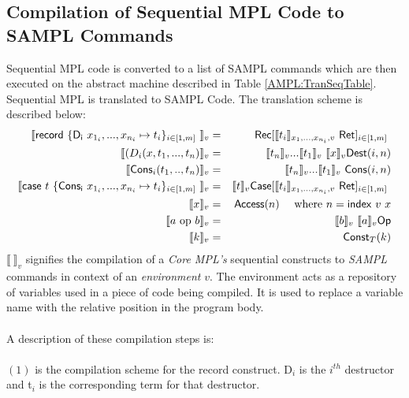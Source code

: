 \documentclass[11pt]{article}
\newcommand{\<}{\langle}
\renewcommand{\>}{\rangle}
\begin{document}
\subsection {Compilation of Sequential MPL Code to SAMPL Commands}
Sequential MPL code is converted to a list of SAMPL commands which are then executed on the abstract machine described in Table \ref {AMPL:TranSeqTable}. Sequential MPL is translated to SAMPL Code. The translation scheme is described below: 
 \begin{eqnarray} 
  \llbracket {\sf record}~\{ {\sf D_i} ~x_{1_i},...,x_{n_i} \mapsto t_i \}_{i \in [1,m]~} \rrbracket_v & = & {\sf Rec}[\llbracket t_i \rrbracket_{x_1,...,x_{n_i},v} ~{\sf Ret}]_{i \in [1,m]~} \\
  \llbracket (D_i(x,t_1,...,t_n) \rrbracket_v & = & \llbracket t_n \rrbracket_v ... \llbracket t_1 \rrbracket_v ~\llbracket x \rrbracket_v {\sf Dest}(i,n) \\
  \llbracket {\sf Cons}_i(t_1,..,t_n) \rrbracket_v & = & \llbracket t_n \rrbracket_v ... \llbracket t_1 \rrbracket_v ~ {\sf Cons}(i,n) \\
  \llbracket {\sf case} ~ t~ \{ {\sf Cons_i} ~x_{1_i},...,x_{n_i} \mapsto t_i \}_{i \in [1,m]~} \rrbracket_v & = & \llbracket t \rrbracket_v {\sf Case} [\llbracket t_i \rrbracket_{x_1,...,x_{n_i},v} ~{\sf Ret}]_{i \in [1,m]~} \\
  \llbracket x \rrbracket_v & = & {\sf Access}(n) ~~~~\mbox{where $n={\sf index}~v~x$} \\
   \llbracket a~{\rm op}~b \rrbracket_v & = & \llbracket b \rrbracket_v ~ \llbracket a \rrbracket_v {\sf Op} \\
    \llbracket k\rrbracket_v & = & {\sf Const}_T(k) 
  \end{eqnarray}
${\llbracket ~\rrbracket}_v$ signifies the compilation of a {\em Core MPL's} sequential constructs to {\em SAMPL} commands in context of an {\em environment} $v$. The environment acts as a repository of variables used in a piece of code being compiled. It is used to replace a variable name with the relative position in the program body.
~~\\~~\\
A description of these compilation steps is:
~~\\~~\\
$(1)$ is the compilation scheme for the {\sf record} construct. {\sf D$_i$} is the $i^{th}$ destructor and {\sf t$_i$} is the corresponding term for that destructor.
~~\\~~\\
\end{document}
